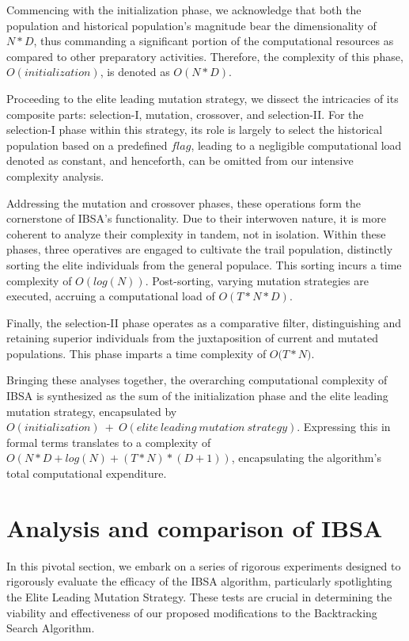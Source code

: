 \documentclass{article} %
\begin{document}
Commencing with the initialization phase, we acknowledge that both the population and historical population's magnitude bear the dimensionality of $N*D$, thus commanding a significant portion of the computational resources as compared to other preparatory activities. Therefore, the complexity of this phase, $O(initialization)$, is denoted as $O(N*D)$.

Proceeding to the elite leading mutation strategy, we dissect the intricacies of its composite parts: selection-I, mutation, crossover, and selection-II. For the selection-I phase within this strategy, its role is largely to select the historical population based on a predefined $flag$, leading to a negligible computational load denoted as constant, and henceforth, can be omitted from our intensive complexity analysis.

Addressing the mutation and crossover phases, these operations form the cornerstone of IBSA's functionality. Due to their interwoven nature, it is more coherent to analyze their complexity in tandem, not in isolation. Within these phases, three operatives are engaged to cultivate the trail population, distinctly sorting the elite individuals from the general populace. This sorting incurs a time complexity of $O(log(N))$. Post-sorting, varying mutation strategies are executed, accruing a computational load of $O(T*N*D)$.

Finally, the selection-II phase operates as a comparative filter, distinguishing and retaining superior individuals from the juxtaposition of current and mutated populations. This phase imparts a time complexity of $O($$T*N)$.

Bringing these analyses together, the overarching computational complexity of IBSA is synthesized as the sum of the initialization phase and the elite leading mutation strategy, encapsulated by $O(initialization)\ +\ O(elite\ leading\ mutation\ strategy)$. Expressing this in formal terms translates to a complexity of $O(N*D+log(N)+(T*N)*(D+1))$, encapsulating the algorithm's total computational expenditure.


\section{ Analysis and comparison of IBSA}

In this pivotal section, we embark on a series of rigorous experiments designed to rigorously evaluate the efficacy of the IBSA algorithm, particularly spotlighting the Elite Leading Mutation Strategy. These tests are crucial in determining the viability and effectiveness of our proposed modifications to the Backtracking Search Algorithm.
\end{document}
